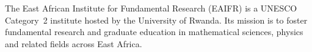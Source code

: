 The East African Institute for Fundamental Research (EAIFR) is a UNESCO Category~2
institute hosted by the University of Rwanda. Its mission is to foster fundamental
research and graduate education in mathematical sciences, physics and related fields
across East Africa.

\lipsum[1-2]
